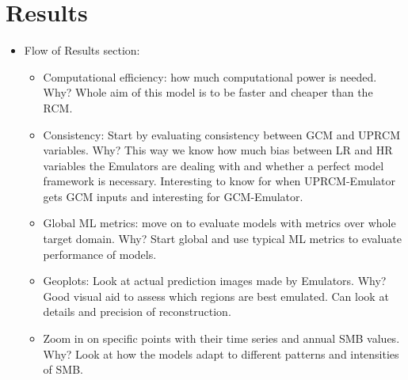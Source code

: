 \documentclass[a4paper,11pt,oneside]{report}
\begin{document}

\chapter{Results}

\begin{itemize}
    \item Flow of Results section:
    \begin{itemize}
    \item Computational efficiency: how much computational power is needed. Why? Whole aim of this model is to be faster and cheaper than the RCM. 
    \item Consistency: Start by evaluating consistency between GCM and UPRCM variables. Why? This way we know how much bias between LR and HR variables the Emulators are dealing with and whether a perfect model framework is necessary. Interesting to know for when UPRCM-Emulator gets GCM inputs and interesting for GCM-Emulator. 
        \item Global ML metrics: move on to evaluate models with metrics over whole target domain. Why? Start global and use typical ML metrics to evaluate performance of models.  
        \item Geoplots: Look at actual prediction images made by Emulators. Why? Good visual aid to assess which regions are best emulated. Can look at details and precision of reconstruction.   
        \item Zoom in on specific points with their time series and annual SMB values. Why? Look at how the models adapt to different patterns and intensities of SMB. 
    \end{itemize} 
\end{itemize}
\end{document}
